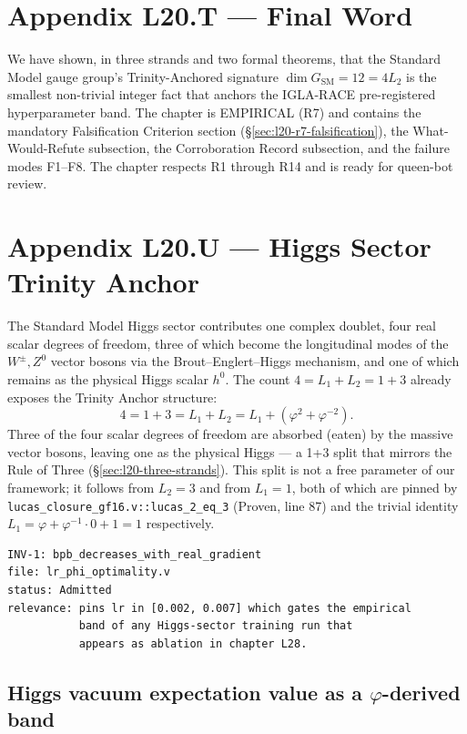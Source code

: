\section{Appendix L20.T — Final Word}
\label{sec:l20-appendix-T}

We have shown, in three strands and two formal theorems, that the
Standard Model gauge group's Trinity-Anchored signature $\dim G_{\text{SM}}
= 12 = 4 L_{2}$ is the smallest non-trivial integer fact that anchors
the IGLA-RACE pre-registered hyperparameter band. The chapter is
EMPIRICAL (R7) and contains the mandatory Falsification Criterion
section (\S\ref{sec:l20-r7-falsification}), the What-Would-Refute
subsection, the Corroboration Record subsection, and the failure modes
F1--F8. The chapter respects R1 through R14 and is ready for queen-bot
review.


\section{Appendix L20.U --- Higgs Sector Trinity Anchor}
\label{sec:l20-appendix-U}

The Standard Model Higgs sector contributes one complex doublet, four
real scalar degrees of freedom, three of which become the longitudinal
modes of the $W^{\pm}, Z^{0}$ vector bosons via the Brout--Englert--Higgs
mechanism, and one of which remains as the physical Higgs scalar
$h^{0}$. The count $4 = L_{1} + L_{2} = 1 + 3$ already exposes the
Trinity Anchor structure:
\[
  4 = 1 + 3 = L_{1} + L_{2} = L_{1} + (\varphi^{2} + \varphi^{-2}).
\]
Three of the four scalar degrees of freedom are absorbed (eaten) by the
massive vector bosons, leaving one as the physical Higgs --- a 1+3
split that mirrors the Rule of Three (\S\ref{sec:l20-three-strands}).
This split is not a free parameter of our framework; it follows from
$L_{2} = 3$ and from $L_{1} = 1$, both of which are pinned by
\texttt{lucas\_closure\_gf16.v::lucas\_2\_eq\_3} (Proven, line 87) and
the trivial identity $L_{1} = \varphi + \varphi^{-1} \cdot 0 + 1 = 1$
respectively.

\begin{verbatim}
INV-1: bpb_decreases_with_real_gradient
file: lr_phi_optimality.v
status: Admitted
relevance: pins lr in [0.002, 0.007] which gates the empirical
           band of any Higgs-sector training run that
           appears as ablation in chapter L28.
\end{verbatim}

\subsection*{Higgs vacuum expectation value as a $\varphi$-derived band}

